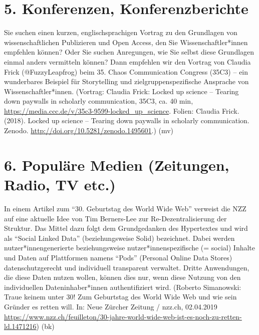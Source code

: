 \documentclass[a4paper,
fontsize=11pt,
oneside,
numbers=noperiodatend,
parskip=half-,
bibliography=totoc,
final
]{scrartcl}
\begin{document}
\hypertarget{konferenzen-konferenzberichte}{%
\section*{5. Konferenzen,
Konferenzberichte}\label{konferenzen-konferenzberichte}}

Sie suchen einen kurzen, englischsprachigen Vortrag zu den Grundlagen
von wissenschaftlichen Publizieren und Open Access, den Sie
Wissenschaftler*innen empfehlen können? Oder Sie suchen Anregungen, wie
Sie selbst diese Grundlagen einmal anders vermitteln können? Dann
empfehlen wir den Vortrag von Claudia Frick (@FuzzyLeapfrog) beim 35.
Chaos Communication Congress (35C3) -- ein wunderbares Beispiel für
Storytelling und zielgruppenspezifische Ansprache von
Wissenschaftler*innen. (Vortrag: Claudia Frick: Locked up science --
Tearing down paywalls in scholarly communication, 35C3, ca. 40 min,
\url{https://media.ccc.de/v/35c3-9599-locked_up_science}. Folien:
Claudia Frick. (2018). Locked up science -- Tearing down paywalls in
scholarly communication. Zenodo.
\url{http://doi.org/10.5281/zenodo.1495601}.) (mv)

\hypertarget{populuxe4re-medien-zeitungen-radio-tv-etc.}{%
\section*{6. Populäre Medien (Zeitungen, Radio, TV
etc.)}\label{populuxe4re-medien-zeitungen-radio-tv-etc.}}

In einem Artikel zum \enquote{30. Geburtstag des World Wide Web}
verweist die NZZ auf eine aktuelle Idee von Tim Berners-Lee zur
Re-Dezentralisierung der Struktur. Das Mittel dazu folgt dem
Grundgedanken des Hypertextes und wird als \enquote{Social Linked Data}
(beziehungsweise Solid) bezeichnet. Dabei werden nutzer*innengenerierte
beziehungsweise nutzer*innenspezifische (= social) Inhalte und Daten auf
Plattformen namens \enquote{Pods} (Personal Online Data Stores)
datenschutzgerecht und individuell transparent verwaltet. Dritte
Anwendungen, die diese Daten nutzen wollen, können dies nur, wenn diese
Nutzung von den individuellen Dateninhaber*innen authentifiziert wird.
(Roberto Simanowski: Traue keinem unter 30! Zum Geburtstag des World
Wide Web und wie sein Gründer es retten will. In: Neue Zürcher Zeitung /
nzz.ch, 02.04.2019
\url{https://www.nzz.ch/feuilleton/30-jahre-world-wide-web-ist-es-noch-zu-retten-ld.1471216})
(bk)
\end{document}
